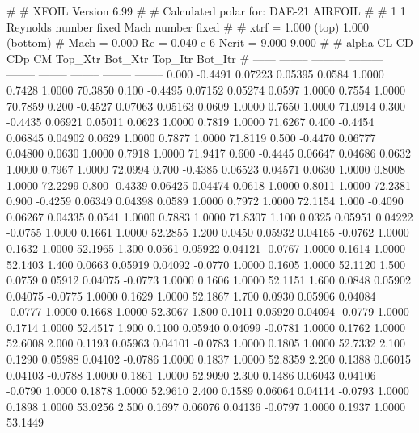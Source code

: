#  
#       XFOIL         Version 6.99
#  
# Calculated polar for: DAE-21 AIRFOIL                                  
#  
# 1 1 Reynolds number fixed          Mach number fixed         
#  
# xtrf =   1.000 (top)        1.000 (bottom)  
# Mach =   0.000     Re =     0.040 e 6     Ncrit =   9.000  9.000
#  
#   alpha    CL        CD       CDp       CM     Top_Xtr  Bot_Xtr  Top_Itr  Bot_Itr
#  ------ -------- --------- --------- -------- -------- -------- -------- --------
   0.000  -0.4491   0.07223   0.05395   0.0584   1.0000   0.7428   1.0000  70.3850
   0.100  -0.4495   0.07152   0.05274   0.0597   1.0000   0.7554   1.0000  70.7859
   0.200  -0.4527   0.07063   0.05163   0.0609   1.0000   0.7650   1.0000  71.0914
   0.300  -0.4435   0.06921   0.05011   0.0623   1.0000   0.7819   1.0000  71.6267
   0.400  -0.4454   0.06845   0.04902   0.0629   1.0000   0.7877   1.0000  71.8119
   0.500  -0.4470   0.06777   0.04800   0.0630   1.0000   0.7918   1.0000  71.9417
   0.600  -0.4445   0.06647   0.04686   0.0632   1.0000   0.7967   1.0000  72.0994
   0.700  -0.4385   0.06523   0.04571   0.0630   1.0000   0.8008   1.0000  72.2299
   0.800  -0.4339   0.06425   0.04474   0.0618   1.0000   0.8011   1.0000  72.2381
   0.900  -0.4259   0.06349   0.04398   0.0589   1.0000   0.7972   1.0000  72.1154
   1.000  -0.4090   0.06267   0.04335   0.0541   1.0000   0.7883   1.0000  71.8307
   1.100   0.0325   0.05951   0.04222  -0.0755   1.0000   0.1661   1.0000  52.2855
   1.200   0.0450   0.05932   0.04165  -0.0762   1.0000   0.1632   1.0000  52.1965
   1.300   0.0561   0.05922   0.04121  -0.0767   1.0000   0.1614   1.0000  52.1403
   1.400   0.0663   0.05919   0.04092  -0.0770   1.0000   0.1605   1.0000  52.1120
   1.500   0.0759   0.05912   0.04075  -0.0773   1.0000   0.1606   1.0000  52.1151
   1.600   0.0848   0.05902   0.04075  -0.0775   1.0000   0.1629   1.0000  52.1867
   1.700   0.0930   0.05906   0.04084  -0.0777   1.0000   0.1668   1.0000  52.3067
   1.800   0.1011   0.05920   0.04094  -0.0779   1.0000   0.1714   1.0000  52.4517
   1.900   0.1100   0.05940   0.04099  -0.0781   1.0000   0.1762   1.0000  52.6008
   2.000   0.1193   0.05963   0.04101  -0.0783   1.0000   0.1805   1.0000  52.7332
   2.100   0.1290   0.05988   0.04102  -0.0786   1.0000   0.1837   1.0000  52.8359
   2.200   0.1388   0.06015   0.04103  -0.0788   1.0000   0.1861   1.0000  52.9090
   2.300   0.1486   0.06043   0.04106  -0.0790   1.0000   0.1878   1.0000  52.9610
   2.400   0.1589   0.06064   0.04114  -0.0793   1.0000   0.1898   1.0000  53.0256
   2.500   0.1697   0.06076   0.04136  -0.0797   1.0000   0.1937   1.0000  53.1449
